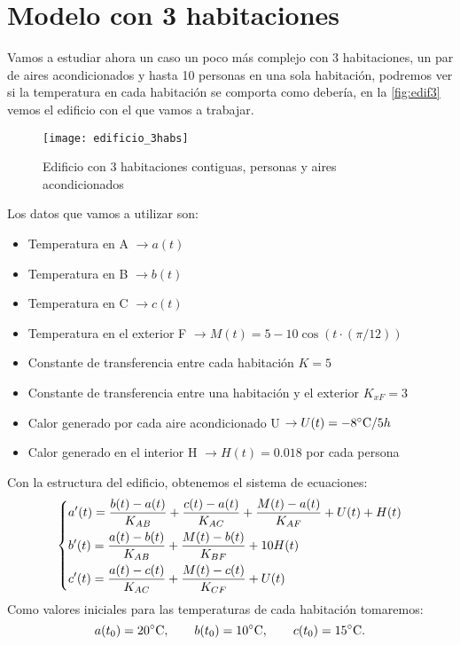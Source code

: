 \section{Modelo con 3 habitaciones}
Vamos a estudiar ahora un caso un poco más complejo con 3 habitaciones, un par de aires acondicionados y hasta 10 personas en una sola habitación, podremos ver si la temperatura en cada habitación se comporta como debería, en la \autoref{fig:edif3} vemos el edificio con el que vamos a trabajar.
\begin{figure}[h!]
	\centering
	\texttt{[image: edificio\_3habs]}
	\caption{Edificio con 3 habitaciones contiguas, personas y aires acondicionados}
	\label{fig:edif3}
\end{figure}
Los datos que vamos a utilizar son:
\begin{itemize}
	\item Temperatura en A $\rightarrow a(t)  $ 
	\item Temperatura en B $\rightarrow b(t)  $ 
	\item Temperatura en C $\rightarrow c(t)  $ 
	\item Temperatura en el exterior F $\rightarrow M(t) = 5-10\cos(t\cdot(\pi/12))$
	\item Constante de transferencia entre cada habitación $K = 5$
	\item Constante de transferencia entre una habitación y el exterior $K_{xF} = 3$
	\item Calor generado por cada aire acondicionado U $\rightarrow U(t) = -8\celsius / 5h$
	\item Calor generado en el interior H $\rightarrow H(t) = 0.018$ por cada persona
\end{itemize}
Con la estructura del edificio, obtenemos el sistema de ecuaciones:
\begin{equation}\begin{dcases}
		a'(t)= \dfrac{b(t)-a(t)}{K_{AB}} + \dfrac{c(t)-a(t)}{K_{AC}} + \dfrac{M(t) - a(t)}{K_{AF}} + U(t) + H(t) \\  b'(t)= \dfrac{a(t)-b(t)}{K_{AB}} + \dfrac{M(t) - b(t)}{K_{BF}} + 10H(t) \\ c'(t)= \dfrac{a(t)-c(t)}{K_{AC}} + \dfrac{M(t) - c(t)}{K_{CF}} + U(t) \end{dcases}
\end{equation}
Como valores iniciales para las temperaturas de cada habitación tomaremos:
\begin{equation}
	a(t_0) = 20 \celsius, \qquad b(t_0) = 10 \celsius, \qquad c(t_0) = 15 \celsius.
\end{equation}
